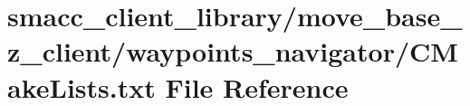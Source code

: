 \hypertarget{smacc__client__library_2move__base__z__client_2waypoints__navigator_2CMakeLists_8txt}{}\section{smacc\+\_\+client\+\_\+library/move\+\_\+base\+\_\+z\+\_\+client/waypoints\+\_\+navigator/\+C\+Make\+Lists.txt File Reference}
\label{smacc__client__library_2move__base__z__client_2waypoints__navigator_2CMakeLists_8txt}
